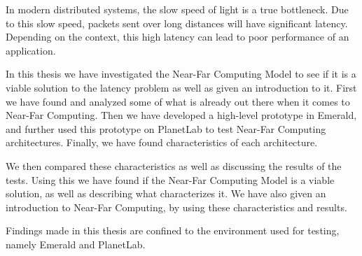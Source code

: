 In modern distributed systems, the slow speed of light is a true bottleneck. Due to this slow speed, packets sent over long distances will have significant latency. Depending on the context, this high latency can lead to poor performance of an application.


In this thesis we have investigated the Near-Far Computing Model to see if it is a viable solution to the latency problem as well as given an introduction to it. First we have found and analyzed some of what is already out there when it comes to Near-Far Computing. Then we have developed a high-level prototype in Emerald, and further used this prototype on PlanetLab to test Near-Far Computing architectures. Finally, we have found characteristics of each architecture.

We then compared these characteristics as well as discussing the results of the tests. Using this we have found if the Near-Far Computing Model is a viable solution, as well as describing what characterizes it. We have also given an introduction to Near-Far Computing, by using these characteristics and results.

Findings made in this thesis are confined to the environment used for testing, namely Emerald and PlanetLab.

